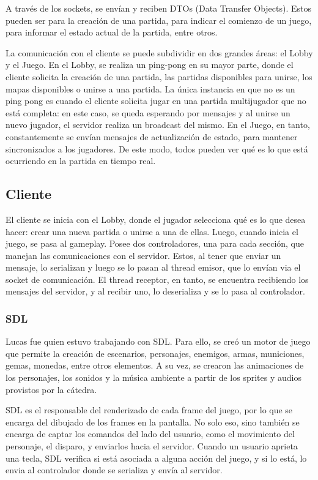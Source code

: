 \documentclass[titlepage,a4paper]{article}
\begin{document}
A través de los sockets, se envían y reciben DTOs (Data Transfer Objects). Estos pueden ser para la creación de una partida, para indicar el comienzo de un juego, para informar el estado actual de la partida, entre otros. 

La comunicación con el cliente se puede subdividir en dos grandes áreas: el Lobby y el Juego. En el Lobby, se realiza un ping-pong en su mayor parte, donde el cliente solicita la creación de una partida, las partidas disponibles para unirse, los mapas disponibles o unirse a una partida. La única instancia en que no es un ping pong es cuando el cliente solicita jugar en una partida multijugador que no está completa: en este caso, se queda esperando por mensajes y al unirse un nuevo jugador, el servidor realiza un broadcast del mismo. En el Juego, en tanto, constantemente se envían mensajes de actualización de estado, para mantener sincronizados a los jugadores. De este modo, todos pueden ver qué es lo que está ocurriendo en la partida en tiempo real.

\subsection{Cliente}
El cliente se inicia con el Lobby, donde el jugador selecciona qué es lo que desea hacer: crear una nueva partida o unirse a una de ellas. Luego, cuando inicia el juego, se pasa al gameplay. Posee dos controladores, una para cada sección, que manejan las comunicaciones con el servidor. Estos, al tener que enviar un mensaje, lo serializan y luego se lo pasan al thread emisor, que lo envían via el socket de comunicación. El thread receptor, en tanto, se encuentra recibiendo los mensajes del servidor, y al recibir uno, lo deserializa y se lo pasa al controlador.

\subsubsection{SDL}
Lucas fue quien estuvo trabajando con SDL. Para ello, se creó un motor de juego que permite la creación de escenarios, personajes, enemigos, armas, municiones, gemas, monedas, entre otros elementos. A su vez, se crearon las animaciones de los personajes, los sonidos y la música ambiente a partir de los sprites y audios provistos por la cátedra. 

SDL es el responsable del renderizado de cada frame del juego, por lo que se encarga del dibujado de los frames en la pantalla. No solo eso, sino también se encarga de captar los comandos del lado del usuario, como el movimiento del personaje, el disparo, y enviarlos hacia el servidor. Cuando un usuario aprieta una tecla, SDL verifica si está asociada a alguna acción del juego, y si lo está, lo envia al controlador donde se serializa y envía al servidor.
\end{document}
